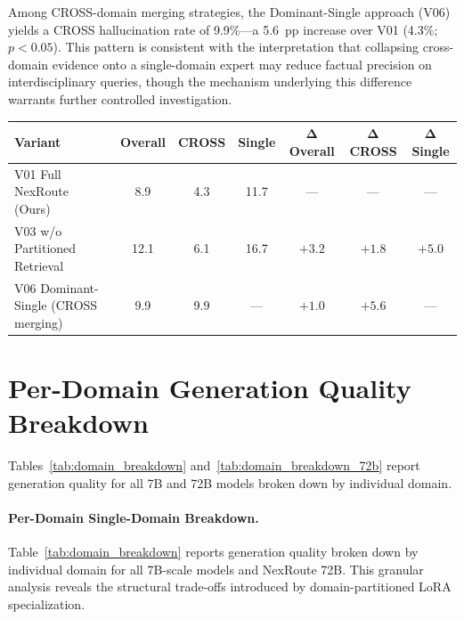 \documentclass[a4paper,fleql]{cas-sc}
\begin{document}
Among CROSS-domain merging strategies, the Dominant-Single approach (V06)
yields a CROSS hallucination rate of 9.9\%---a 5.6~pp increase over V01
(4.3\%; $p{<}0.05$). This pattern is consistent with the interpretation that
collapsing cross-domain evidence onto a single-domain expert may reduce
factual precision on interdisciplinary queries, though the mechanism
underlying this difference warrants further controlled investigation.

\begin{center}
\begingroup
\begin{tabular}{lcccccc}
\toprule
\textbf{Variant} & \textbf{Overall} & \textbf{CROSS} & \textbf{Single} & $\boldsymbol{\Delta}$\textbf{Overall} & $\boldsymbol{\Delta}$\textbf{CROSS} & $\boldsymbol{\Delta}$\textbf{Single} \\
\midrule
V01 Full NexRoute (Ours) & 8.9 & 4.3 & 11.7 & --- & --- & --- \\
V03 w/o Partitioned Retrieval & 12.1 & 6.1 & 16.7 & $+3.2$ & $+1.8$ & $+5.0$ \\
V06 Dominant-Single (CROSS merging) & 9.9 & 9.9 & --- & $+1.0$ & $+5.6$ & --- \\
\midrule
\end{tabular}
\label{tab:ablation_extended}
\endgroup
\end{center}


\section{Per-Domain Generation Quality Breakdown}
\label{app:domain_breakdown}
Tables~\ref{tab:domain_breakdown} and~\ref{tab:domain_breakdown_72b} report generation quality for all 7B and 72B models broken down by individual domain.

\paragraph{Per-Domain Single-Domain Breakdown.}
Table~\ref{tab:domain_breakdown} reports generation quality broken down by
individual domain for all 7B-scale models and NexRoute 72B. This granular
analysis reveals the structural trade-offs introduced by domain-partitioned
LoRA specialization.
\end{document}

